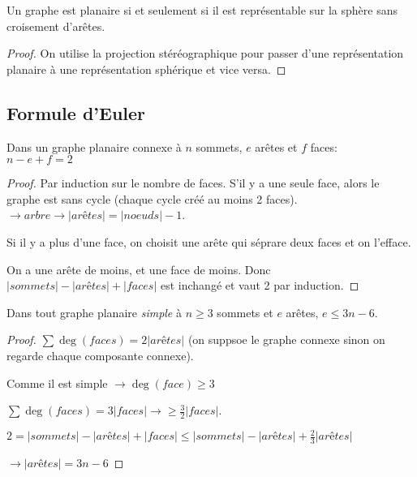 \begin{mytheo}
  Un graphe est planaire si et seulement si il est représentable sur la sphère sans croisement d'arêtes.
  \begin{proof}
  On utilise la projection stéréographique pour passer d'une représentation planaire à une représentation sphérique et vice versa.
  \end{proof}
\end{mytheo}

\subsection{Formule d'Euler}
\begin{mytheo} 
  Dans un graphe planaire connexe à $n$ sommets, $e$ arêtes et $f$ faces:\\
  $n−e+f =2$
  \begin{proof}
    Par induction sur le nombre de faces.
    S'il y a une seule face, alors le graphe est sans cycle (chaque cycle créé au moins 2 faces).
    $\rightarrow arbre \rightarrow |arêtes| = |noeuds|-1$.
    
    Si il y a plus d'une face, on choisit une arête qui séprare deux faces et on l'efface.
    
    On a une arête de moins, et une face de moins. Donc $|sommets| - |arêtes| + |faces|$ est inchangé et vaut 2 par induction.
  \end{proof}
\end{mytheo}

\begin{mytheo}
  \label{theo:threensix}
  Dans tout graphe planaire \emph{simple} à $n \geq 3$ sommets et $e$ arêtes,
  $e \leq 3n - 6$.
  \begin{proof}
    $\sum \deg(faces) = 2 |arêtes|$ (on suppsoe le graphe connexe sinon on regarde chaque composante connexe).  
      
    Comme il est simple $\rightarrow \deg(face) \geq 3$
    
    $\sum \deg(faces) = 3 |faces| \rightarrow \geq \frac{3}{2}|faces|$.
    
    $2 = |sommets|-|arêtes| + |faces| \leq |sommets|-|arêtes| + \frac{2}{3}|arêtes|$
    
    $\rightarrow |arêtes| = 3n-6$
  \end{proof}
\end{mytheo}

